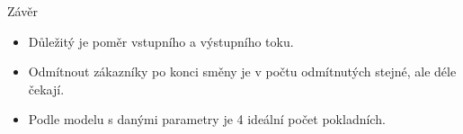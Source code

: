 \begin{frame}{Závěr}
    \begin{itemize}
        \item Důležitý je poměr vstupního a výstupního toku. 
        \item Odmítnout zákazníky po konci směny je v počtu odmítnutých 
        stejné, ale déle čekají. 
        \item Podle modelu s danými parametry je 4 ideální počet pokladních.
    \end{itemize}
\end{frame}